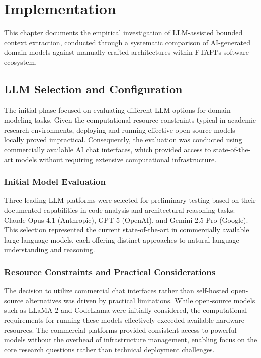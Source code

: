 \chapter{Implementation}\label{chapter:implementation}
This chapter documents the empirical investigation of LLM-assisted bounded context extraction, conducted through a systematic comparison of AI-generated domain models against manually-crafted architectures within FTAPI's software ecosystem.

\section{LLM Selection and Configuration}
The initial phase focused on evaluating different LLM options for domain modeling tasks. Given the computational resource constraints typical in academic research environments, deploying and running effective open-source models locally proved impractical. Consequently, the evaluation was conducted using commercially available AI chat interfaces, which provided access to state-of-the-art models without requiring extensive computational infrastructure.

\subsection{Initial Model Evaluation}
Three leading LLM platforms were selected for preliminary testing based on their documented capabilities in code analysis and architectural reasoning tasks: Claude Opus 4.1 (Anthropic), GPT-5 (OpenAI), and Gemini 2.5 Pro (Google). This selection represented the current state-of-the-art in commercially available large language models, each offering distinct approaches to natural language understanding and reasoning.

\subsection{Resource Constraints and Practical Considerations}
The decision to utilize commercial chat interfaces rather than self-hosted open-source alternatives was driven by practical limitations. While open-source models such as LLaMA 2 and CodeLlama were initially considered, the computational requirements for running these models effectively exceeded available hardware resources. The commercial platforms provided consistent access to powerful models without the overhead of infrastructure management, enabling focus on the core research questions rather than technical deployment challenges.

